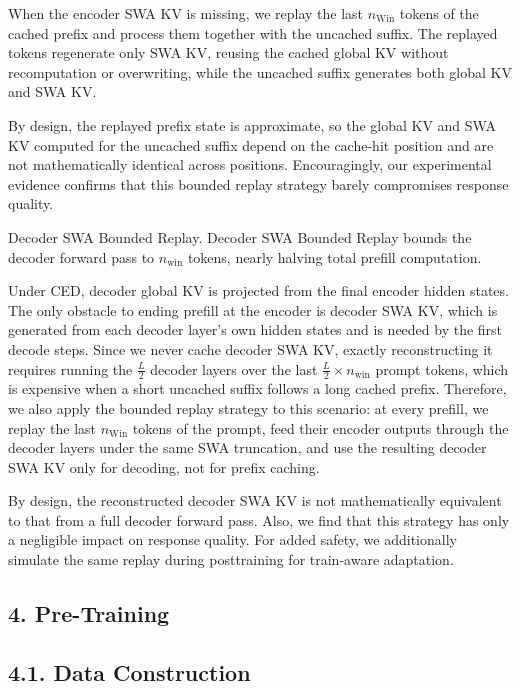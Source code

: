 \documentclass[
  10
]{article}
\begin{document}
When the encoder SWA KV is missing, we replay the last
\(n _ { \mathrm { W i n } }\) tokens of the cached prefix and process
them together with the uncached suffix. The replayed tokens regenerate
only SWA KV, reusing the cached global KV without recomputation or
overwriting, while the uncached suffix generates both global KV and SWA
KV.

By design, the replayed prefix state is approximate, so the global KV
and SWA KV computed for the uncached suffix depend on the cache-hit
position and are not mathematically identical across positions.
Encouragingly, our experimental evidence confirms that this bounded
replay strategy barely compromises response quality.

Decoder SWA Bounded Replay. Decoder SWA Bounded Replay bounds the
decoder forward pass to \(n _ { \mathrm { w i n } }\) tokens, nearly
halving total prefill computation.

Under CED, decoder global KV is projected from the final encoder hidden
states. The only obstacle to ending prefill at the encoder is decoder
SWA KV, which is generated from each decoder layer's own hidden states
and is needed by the first decode steps. Since we never cache decoder
SWA KV, exactly reconstructing it requires running the
\(\frac { L } { 2 }\) decoder layers over the last
\(\frac { L } { 2 } \times n _ { \mathrm { w i n } }\) prompt tokens,
which is expensive when a short uncached suffix follows a long cached
prefix. Therefore, we also apply the bounded replay strategy to this
scenario: at every prefill, we replay the last
\(n _ { \mathrm { W i n } }\) tokens of the prompt, feed their encoder
outputs through the decoder layers under the same SWA truncation, and
use the resulting decoder SWA KV only for decoding, not for prefix
caching.

By design, the reconstructed decoder SWA KV is not mathematically
equivalent to that from a full decoder forward pass. Also, we find that
this strategy has only a negligible impact on response quality. For
added safety, we additionally simulate the same replay during
posttraining for train-aware adaptation.

\subsection{4. Pre-Training}\label{pre-training}

\subsection{4.1. Data Construction}\label{data-construction}
\end{document}
